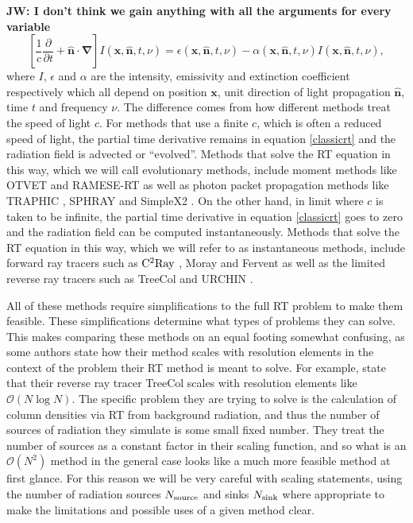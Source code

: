 \documentclass[fleqn,usenatbib]{mnras}
\begin{document}
{\bf JW: I don't think we gain anything with all the arguments for every variable}
\begin{equation} \label{classicrt}
\left[ \frac{1}{c} \frac{\partial}{\partial t} + \mathbf{\hat{n} \cdot \nabla}
 \right] I\left(\mathbf{x}, \mathbf{\hat{n}}, t, \nu\right) = 
\epsilon\left(\mathbf{x}, \mathbf{\hat{n}}, t, \nu\right) - 
\alpha\left(\mathbf{x}, \mathbf{\hat{n}}, t, \nu\right) 
I\left(\mathbf{x}, \mathbf{\hat{n}}, t, \nu\right),
\end{equation}
where $I$, $\epsilon$ and $\alpha$ are the intensity, emissivity and extinction
 coefficient respectively which all depend on position $\mathbf{x}$, 
unit direction of light propagation $\mathbf{\hat{n}}$, time $t$ and frequency 
$\nu$. The difference comes from how different methods treat the speed of 
light $c$. For methods that use a finite $c$, which is often a 
reduced speed of light, the partial time derivative remains in equation 
\ref{classicrt} and the radiation field is advected or ``evolved''. Methods 
that solve the RT equation in this way, which we will call evolutionary 
methods, include moment methods like OTVET \citep{gnedinAbel01} and  RAMESE-RT 
\citep{rosdahlTeyssier15} as well as photon packet propagation methods like 
TRAPHIC \citep{pawlikSchaye08}, SPHRAY \citep{altayEt08} and SimpleX2 
\citep{paardekooperEt10}. On the other hand, in limit where $c$ is taken to be 
infinite, the partial time derivative in equation \ref{classicrt} goes to zero 
and the radiation field can be computed instantaneously. Methods that solve the
 RT equation in this way, which we will refer to as instantaneous methods, 
include forward ray tracers such as $\rm C^2Ray$ \citep{mellemaEt06a}, Moray 
\citep{wiseAbel11} and Fervent \citep{baczynskiEt15} as well as the limited reverse ray 
tracers such as TreeCol \citep{clarkEt12} and URCHIN \citep{altayTheuns13}.

All of these methods require simplifications to the full RT problem to make 
them feasible. These simplifications determine 
what types of problems they can solve. This 
makes comparing these methods on an equal footing somewhat confusing, as some 
authors state how their method scales with resolution elements in the context 
of the problem their RT method is meant to solve. For example, \cite{clarkEt12}
 state that their reverse ray tracer TreeCol scales with resolution elements 
like $\mathcal{O}(N\log{N})$. The specific problem they are trying to solve is 
the calculation of column densities via RT from background radiation, and thus
the number of sources of radiation they simulate is some small fixed number. 
They treat the number of sources as a constant factor in their scaling 
function, and so what is an $\mathcal{O}(N^2)$ method in the general case 
looks like a much more feasible method at first glance. For this reason we will
be very careful with scaling statements, using the number of radiation sources 
$N_{\rm source}$ and sinks $N_{\rm sink}$ where appropriate to make the 
limitations and possible uses of a given method clear.
\end{document}
